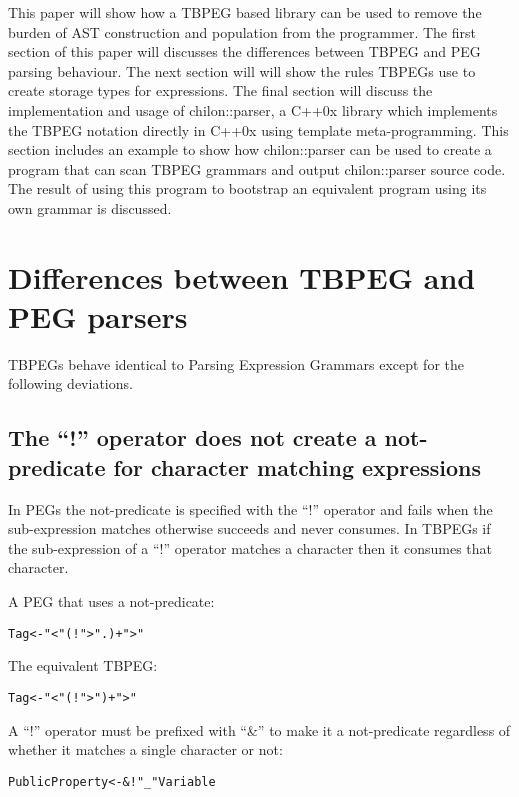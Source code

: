 \documentclass[a4paper,11pt]{article}
\begin{document}
This paper will show how a TBPEG based library can be used to remove the burden of AST construction and population from the programmer.
The first section of this paper will discusses the differences between TBPEG and PEG parsing behaviour.
The next section will will show the rules TBPEGs use to create storage types for expressions.
The final section will discuss the implementation and usage of chilon::parser, a C++0x library which implements the TBPEG notation directly in C++0x using template meta-programming.
This section includes an example to show how chilon::parser can be used to create a program that can scan TBPEG grammars and output chilon::parser source code.
The result of using this program to bootstrap an equivalent program using its own grammar is discussed.

\section{Differences between TBPEG and PEG parsers}

TBPEGs behave identical to Parsing Expression Grammars\cite{peg} except for the following deviations.

\subsection{The ``!'' operator does not create a not-predicate for character matching expressions}

In PEGs the not-predicate is specified with the ``!'' operator and fails when the sub-expression matches otherwise succeeds and never consumes.
In TBPEGs if the sub-expression of a ``!'' operator matches a character then it consumes that character.

A PEG that uses a not-predicate:
\begin{alltt}
    Tag <- "<" (! ">" .)+ ">"
\end{alltt}

The equivalent TBPEG:
\begin{alltt}
    Tag <- "<" (! ">")+ ">"
\end{alltt}

A ``!'' operator must be prefixed with ``\&'' to make it a not-predicate regardless of whether it matches a single character or not:
\begin{alltt}
    PublicProperty <- &!"_" Variable
\end{alltt}
\end{document}
